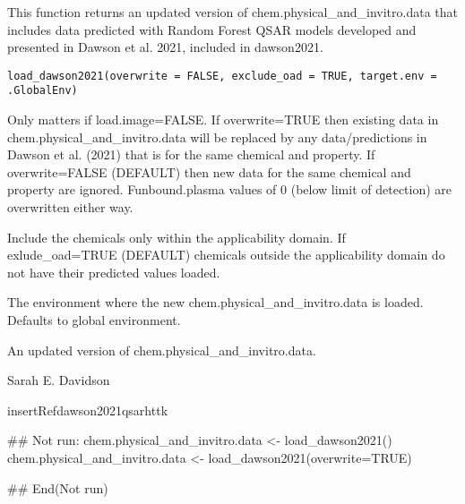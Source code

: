 \documentclass[a4paper]{book}
\begin{document}
%
\begin{Description}\relax
This function returns an updated version of chem.physical\_and\_invitro.data
that includes data predicted with Random Forest QSAR models developed and
presented in Dawson et al. 2021, included in dawson2021.
\end{Description}
%
\begin{Usage}
\begin{verbatim}
load_dawson2021(overwrite = FALSE, exclude_oad = TRUE, target.env = .GlobalEnv)
\end{verbatim}
\end{Usage}
%
\begin{Arguments}
\begin{ldescription}
\item[\code{overwrite}] Only matters if load.image=FALSE. If overwrite=TRUE then
existing data in chem.physical\_and\_invitro.data will be replaced by any
data/predictions in Dawson et al. (2021) that is for the same chemical and
property. If overwrite=FALSE (DEFAULT) then new data for the same chemical
and property are ignored.  Funbound.plasma values of 0 (below limit of
detection) are overwritten either way.

\item[\code{exclude\_oad}] Include the chemicals only within the applicability domain.
If exlude\_oad=TRUE (DEFAULT) chemicals outside the applicability domain do not
have their predicted values loaded.

\item[\code{target.env}] The environment where the new
chem.physical\_and\_invitro.data is loaded. Defaults to global environment.
\end{ldescription}
\end{Arguments}
%
\begin{Value}
\begin{ldescription}
\item[\code{data.frame}] An updated version of
chem.physical\_and\_invitro.data.
\end{ldescription}
\end{Value}
%
\begin{Author}\relax
Sarah E. Davidson
\end{Author}
%
\begin{References}\relax
\bsl{}insertRefdawson2021qsarhttk
\end{References}
%
\begin{Examples}
\begin{ExampleCode}

## Not run: 
chem.physical_and_invitro.data <- load_dawson2021()
chem.physical_and_invitro.data <- load_dawson2021(overwrite=TRUE) 

## End(Not run)                        

\end{ExampleCode}
\end{Examples}
\end{document}
